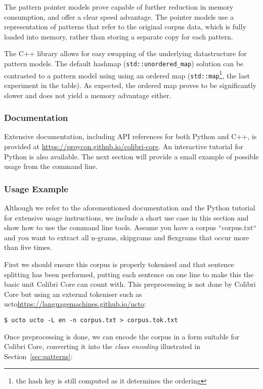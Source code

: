 \documentclass[a4paper,12pt]{article}
\begin{document}
The pattern pointer models prove capable of further reduction in memory
consumption, and offer a clear speed advantage. The pointer models use a
representation of patterns that refer to the original corpus data, which is
fully loaded into memory, rather than storing a separate copy for each pattern. 

The C++ library allows for easy swapping of the underlying datastructure for
pattern models. The default hashmap (\texttt{std::unordered\_map}) solution can
be contrasted to a pattern model using using an ordered map
(\texttt{std::map}\footnote{the hash key is still computed as it determines
the ordering}, the last experiment in the table). As expected, the ordered map proves to be significantly slower
and does not yield a memory advantage either.

\subsubsection{Documentation} 

Extensive documentation, including API references for both Python and C++, is provided at
\url{https://proycon.github.io/colibri-core}. An interactive tutorial for Python is also
available. The next section will provide a small example of possible usage from the command line.

\subsubsection{Usage Example}

Although we refer to the aforementioned documentation and the Python tutorial
for extensive usage instructions, we include a short use case in this section
and show how to use the command line tools.  Assume you have a corpus
``corpus.txt`` and you want to extract all n-grams, skipgrams and flexgrams
that occur more than five times.

First we should ensure this corpus is properly tokenised and that sentence
splitting has been performed, putting each sentence on one line to make this
the basic unit Colibri Core can count with. This preprocessing is not done by
Colibri Core but using an external tokeniser such as ucto\url{https://languagemachines.github.io/ucto}:

\begin{verbatim}
$ ucto ucto -L en -n corpus.txt > corpus.tok.txt
\end{verbatim}

Once preprocessing is done, we can encode the corpus in a form suitable for
Colibri Core, converting it into the \emph{class encoding} illustrated in
Section~\ref{sec:patterns}:
\end{document}
